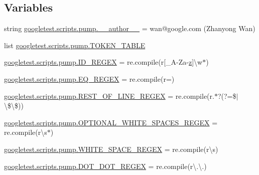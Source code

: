 \subsection*{Variables}
\begin{DoxyCompactItemize}
\item 
string \mbox{\hyperlink{namespacegoogletest_1_1scripts_1_1pump_a607a37549519c02810e957e1cdf24790}{googletest.\+scripts.\+pump.\+\_\+\+\_\+author\+\_\+\+\_\+}} = \textquotesingle{}wan@google.\+com (Zhanyong Wan)\textquotesingle{}
\item 
list \mbox{\hyperlink{namespacegoogletest_1_1scripts_1_1pump_a154dd004d59ae9a5fbe88927e5c7329e}{googletest.\+scripts.\+pump.\+T\+O\+K\+E\+N\+\_\+\+T\+A\+B\+LE}}
\item 
\mbox{\hyperlink{namespacegoogletest_1_1scripts_1_1pump_a6b5380adbd6b51c2ec0ce084b8775c9f}{googletest.\+scripts.\+pump.\+I\+D\+\_\+\+R\+E\+G\+EX}} = re.\+compile(r\textquotesingle{}\mbox{[}\+\_\+A-\/Za-\/\mbox{\hyperlink{_obj__test_2lib_2googletest-master_2googlemock_2test_2gmock-matchers__test_8cc_a196ff6a287f53f758b1506f21269fc77}{z}}\mbox{]}\textbackslash{}w$\ast$\textquotesingle{})
\item 
\mbox{\hyperlink{namespacegoogletest_1_1scripts_1_1pump_a9767f4cde408eaae46383b9c1fd6e3aa}{googletest.\+scripts.\+pump.\+E\+Q\+\_\+\+R\+E\+G\+EX}} = re.\+compile(r\textquotesingle{}=\textquotesingle{})
\item 
\mbox{\hyperlink{namespacegoogletest_1_1scripts_1_1pump_adcca53cab9206919495b7499a34cd00a}{googletest.\+scripts.\+pump.\+R\+E\+S\+T\+\_\+\+O\+F\+\_\+\+L\+I\+N\+E\+\_\+\+R\+E\+G\+EX}} = re.\+compile(r\textquotesingle{}.$\ast$?(?=\$$\vert$\textbackslash{}\$\textbackslash{}\$)\textquotesingle{})
\item 
\mbox{\hyperlink{namespacegoogletest_1_1scripts_1_1pump_a5541e891448a546123da2a33e1f410ee}{googletest.\+scripts.\+pump.\+O\+P\+T\+I\+O\+N\+A\+L\+\_\+\+W\+H\+I\+T\+E\+\_\+\+S\+P\+A\+C\+E\+S\+\_\+\+R\+E\+G\+EX}} = re.\+compile(r\textquotesingle{}\textbackslash{}s$\ast$\textquotesingle{})
\item 
\mbox{\hyperlink{namespacegoogletest_1_1scripts_1_1pump_afcbc216b34a3ba89d22ac7778233e1ed}{googletest.\+scripts.\+pump.\+W\+H\+I\+T\+E\+\_\+\+S\+P\+A\+C\+E\+\_\+\+R\+E\+G\+EX}} = re.\+compile(r\textquotesingle{}\textbackslash{}s\textquotesingle{})
\item 
\mbox{\hyperlink{namespacegoogletest_1_1scripts_1_1pump_a5a1380680c4727f9c84057c7504eca60}{googletest.\+scripts.\+pump.\+D\+O\+T\+\_\+\+D\+O\+T\+\_\+\+R\+E\+G\+EX}} = re.\+compile(r\textquotesingle{}\textbackslash{}.\textbackslash{}.\textquotesingle{})
\end{DoxyCompactItemize}

